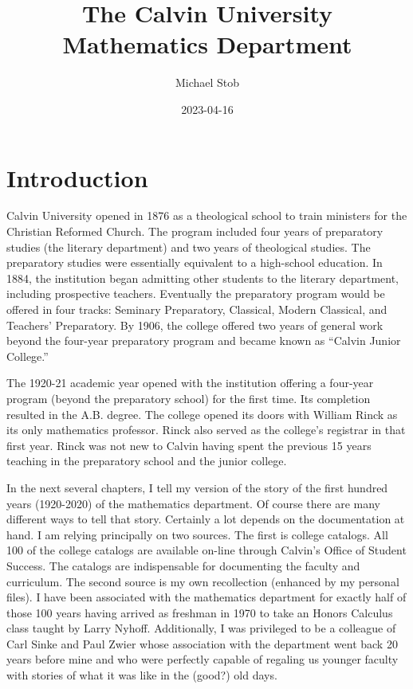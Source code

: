 \documentclass[
]{book}
\title{The Calvin University Mathematics Department}
\author{Michael Stob}
\date{2023-04-16}
\begin{document}
\maketitle

{
\setcounter{tocdepth}{1}
\tableofcontents
}
\hypertarget{introduction}{%
\chapter{Introduction}\label{introduction}}

Calvin University opened in 1876 as a theological school to train ministers for the Christian Reformed Church. The program included four years of preparatory studies (the literary department) and two years of theological studies. The preparatory studies were essentially equivalent to a high-school education. In 1884, the institution began admitting other students to the literary department, including prospective teachers. Eventually the preparatory program would be offered in four tracks: Seminary Preparatory, Classical, Modern Classical, and Teachers' Preparatory. By 1906, the college offered two years of general work beyond the four-year preparatory program and became known as ``Calvin Junior College.''

The 1920-21 academic year opened with the institution offering a four-year program (beyond the preparatory school) for the first time. Its completion resulted in the A.B. degree. The college opened its doors with William Rinck as its only mathematics professor. Rinck also served as the college's registrar in that first year. Rinck was not new to Calvin having spent the previous 15 years teaching in the preparatory school and the junior college.

In the next several chapters, I tell my version of the story of the first hundred years (1920-2020) of the mathematics department. Of course there are many different ways to tell that story. Certainly a lot depends on the documentation at hand. I am relying principally on two sources. The first is college catalogs. All 100 of the college catalogs are available on-line through Calvin's Office of Student Success. The catalogs are indispensable for documenting the faculty and curriculum. The second source is my own recollection (enhanced by my personal files). I have been associated with the mathematics department for exactly half of those 100 years having arrived as freshman in 1970 to take an Honors Calculus class taught by Larry Nyhoff. Additionally, I was privileged to be a colleague of Carl Sinke and Paul Zwier whose association with the department went back 20 years before mine and who were perfectly capable of regaling us younger faculty with stories of what it was like in the (good?) old days.
\end{document}
